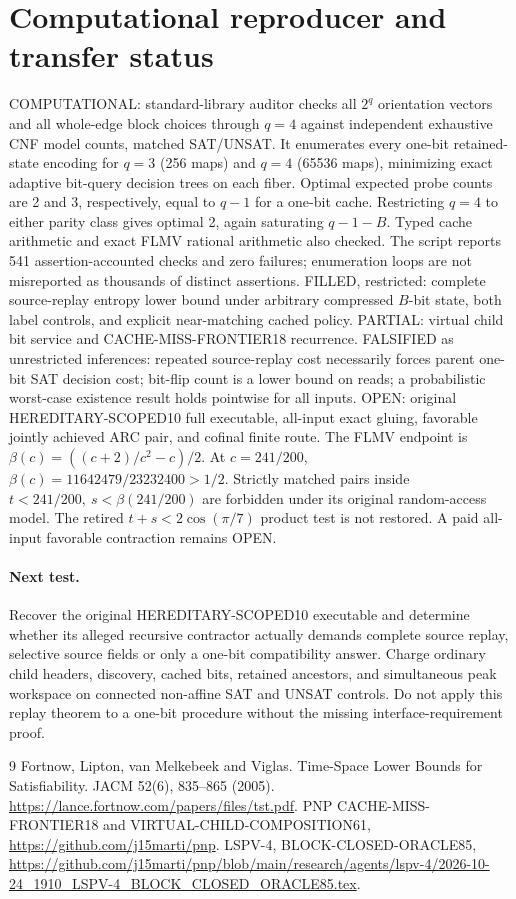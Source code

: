 \documentclass[11pt]{article}
\begin{document}
\section{Computational reproducer and transfer status}
COMPUTATIONAL: standard-library auditor checks all $2^q$ orientation vectors and all whole-edge block choices through $q=4$ against independent exhaustive CNF model counts, matched SAT/UNSAT. It enumerates every one-bit retained-state encoding for $q=3$ (256 maps) and $q=4$ (65536 maps), minimizing exact adaptive bit-query decision trees on each fiber. Optimal expected probe counts are 2 and 3, respectively, equal to $q-1$ for a one-bit cache. Restricting $q=4$ to either parity class gives optimal 2, again saturating $q-1-B$. Typed cache arithmetic and exact FLMV rational arithmetic also checked. The script reports 541 assertion-accounted checks and zero failures; enumeration loops are not misreported as thousands of distinct assertions.
FILLED, restricted: complete source-replay entropy lower bound under arbitrary compressed $B$-bit state, both label controls, and explicit near-matching cached policy. PARTIAL: virtual child bit service and CACHE-MISS-FRONTIER18 recurrence. FALSIFIED as unrestricted inferences: repeated source-replay cost necessarily forces parent one-bit SAT decision cost; bit-flip count is a lower bound on reads; a probabilistic worst-case existence result holds pointwise for all inputs. OPEN: original HEREDITARY-SCOPED10 full executable, all-input exact gluing, favorable jointly achieved ARC pair, and cofinal finite route.
The FLMV endpoint is $\beta(c)=((c+2)/c^2-c)/2$. At $c=241/200$, $\beta(c)=11642479/23232400>1/2$. Strictly matched pairs inside $t<241/200,\ s<\beta(241/200)$ are forbidden under its original random-access model. The retired $t+s<2\cos(\pi/7)$ product test is not restored. A paid all-input favorable contraction remains OPEN.
\paragraph{Next test.}
Recover the original HEREDITARY-SCOPED10 executable and determine whether its alleged recursive contractor actually demands complete source replay, selective source fields or only a one-bit compatibility answer. Charge ordinary child headers, discovery, cached bits, retained ancestors, and simultaneous peak workspace on connected non-affine SAT and UNSAT controls. Do not apply this replay theorem to a one-bit procedure without the missing interface-requirement proof.
\begin{thebibliography}{9}
 Fortnow, Lipton, van Melkebeek and Viglas. Time-Space Lower Bounds for Satisfiability. JACM 52(6), 835--865 (2005). \url{https://lance.fortnow.com/papers/files/tst.pdf}.
 PNP CACHE-MISS-FRONTIER18 and VIRTUAL-CHILD-COMPOSITION61, \url{https://github.com/j15marti/pnp}.
 LSPV-4, BLOCK-CLOSED-ORACLE85, \url{https://github.com/j15marti/pnp/blob/main/research/agents/lspv-4/2026-10-24_1910_LSPV-4_BLOCK_CLOSED_ORACLE85.tex}.
\end{thebibliography}
\end{document}
